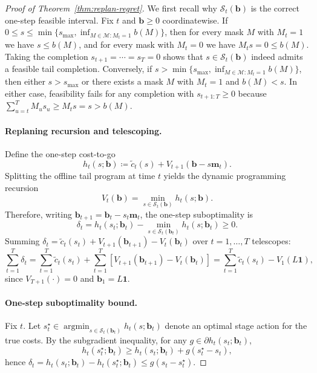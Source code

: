 \documentclass{uai2026} %
\newcommand{\1}{\mathbf{1}}
\newcommand{\scalt}{\mathcal{S}_{t}}
\newcommand{\mcal}{\mathcal{M}}
\newcommand{\argmin}{\operatorname*{argmin}}
\begin{document}
\begin{proof}[Proof of Theorem~\ref{thm:replan-regret}]
  We first recall why $\scalt(\mathbf{b})$ is the correct one-step feasible interval.
  Fix $t$ and $\mathbf{b}\ge 0$ coordinatewise.
  If $0\le s\le \min\{s_{\max},\inf_{M\in\mcal:M_t=1} b(M)\}$, then for every mask $M$ with $M_t=1$ we have $s\le b(M)$, and for every mask with $M_t=0$ we have $M_t s = 0\le b(M)$.
  Taking the completion $s_{t+1}=\cdots=s_T=0$ shows that $s\in\scalt(\mathbf{b})$ indeed admits a feasible tail completion.
  Conversely, if $s>\min\{s_{\max},\inf_{M\in\mcal:M_t=1} b(M)\}$, then either $s>s_{\max}$ or there exists a mask $M$ with $M_t=1$ and $b(M)<s$.
  In either case, feasibility fails for any completion with $s_{t+1:T}\ge 0$ because $\sum_{u=t}^{T} M_u s_u \ge M_t s = s > b(M)$.

  \paragraph{Replaning recursion and telescoping.}
  Define the one-step cost-to-go
  \begin{equation*}
    h_t(s;\mathbf{b})
    \coloneqq
    \tilde{c}_t(s)+V_{t+1}(\mathbf{b}-s\mathbf{m}_t).
  \end{equation*}
  Splitting the offline tail program at time $t$ yields the dynamic programming recursion
  \begin{equation*}
    V_t(\mathbf{b})=\min_{s\in\scalt(\mathbf{b})} h_t(s;\mathbf{b}).
  \end{equation*}
  Therefore, writing $\mathbf{b}_{t+1}=\mathbf{b}_t-s_t\mathbf{m}_t$, the one-step suboptimality is
  \begin{equation*}
    \delta_t
    =
    h_t(s_t;\mathbf{b}_t)-\min_{s\in\scalt(\mathbf{b}_t)}h_t(s;\mathbf{b}_t)
    \ge 0.
  \end{equation*}
  Summing $\delta_t=\tilde{c}_t(s_t)+V_{t+1}(\mathbf{b}_{t+1})-V_t(\mathbf{b}_t)$ over $t=1,\dots,T$ telescopes:
  \begin{equation*}
    \sum_{t=1}^{T}\delta_t
    =
    \sum_{t=1}^{T}\tilde{c}_t(s_t)
    +
    \sum_{t=1}^{T}\left[V_{t+1}(\mathbf{b}_{t+1})-V_t(\mathbf{b}_t)\right]
    =
    \sum_{t=1}^{T}\tilde{c}_t(s_t)-V_1(L\1),
  \end{equation*}
  since $V_{T+1}(\cdot)=0$ and $\mathbf{b}_1=L\1$.

  \paragraph{One-step suboptimality bound.}
  Fix $t$.
  Let $s_t^{\star}\in\argmin_{s\in\scalt(\mathbf{b}_t)}h_t(s;\mathbf{b}_t)$ denote an optimal stage action for the true costs.
  By the subgradient inequality, for any $g\in\partial h_t(s_t;\mathbf{b}_t)$,
  \begin{equation*}
    h_t(s_t^{\star};\mathbf{b}_t)\ge h_t(s_t;\mathbf{b}_t)+g(s_t^{\star}-s_t),
  \end{equation*}
  hence $\delta_t=h_t(s_t;\mathbf{b}_t)-h_t(s_t^{\star};\mathbf{b}_t)\le g(s_t-s_t^{\star})$.


\end{proof}
\end{document}
